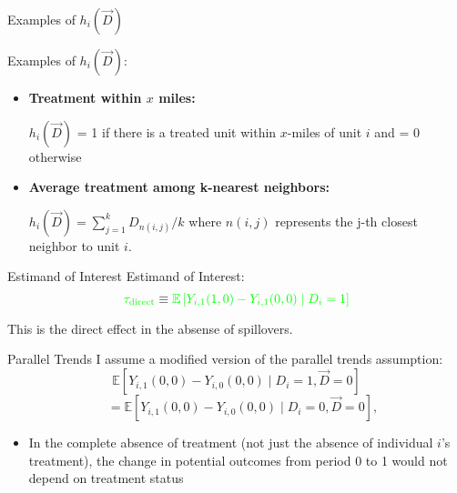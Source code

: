 \documentclass[aspectratio=43]{beamer}
\begin{document}
\begin{frame}{Examples of $h_i(\vec{D})$}
    
    Examples of $h_i(\vec{D})$:
    
    \begin{itemize}
        \item \textbf{Treatment within $x$ miles:}
        
        $h_i(\vec{D})$ = 1 if there is a treated unit within $x$-miles of unit $i$ and = 0 otherwise
            
        \item \textbf{Average treatment among k-nearest neighbors:}
        
        $h_i(\vec{D}) = \sum_{j = 1}^k D_{n(i,j)} / k$ where $n(i,j)$ represents the j-th closest neighbor to unit $i$. 


    \end{itemize}
\end{frame}

\begin{frame}{Estimand of Interest}
    Estimand of Interest: \[ 
        \textcolor{green}{\tau_{\text{direct}}} \equiv \textcolor{green}{\mathbb{E}\left[ Y_{i,1}(1, 0) - Y_{i,1}(0, 0) \mid D_i = 1\right]}
    \]

    This is the direct effect in the absense of spillovers.
\end{frame}

\begin{frame}{Parallel Trends}
    I assume a modified version of the parallel trends assumption: 
    \[
        \mathbb{E}\left[ Y_{i,1}(0, 0) - Y_{i,0}(0, 0) \mid D_i = 1, \vec{D} = 0 \right] 
    \] \[
        \quad =
        \mathbb{E}\left[ Y_{i,1}(0, 0) - Y_{i,0}(0, 0) \mid D_i = 0, \vec{D} = 0 \right],
    \]

    \begin{itemize}
        \item In the complete absence of treatment (not just the absence of individual $i$'s treatment), the change in potential outcomes from period 0 to 1 would not depend on treatment status
    \end{itemize}
\end{frame}
\end{document}
